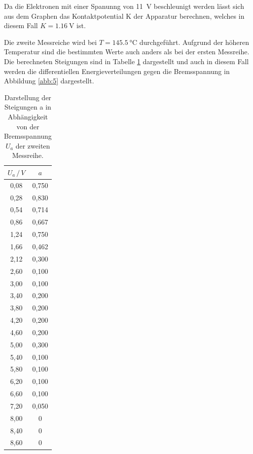 Da die Elektronen mit einer Spanunng von \SI{11}{\volt} beschleunigt werden lässt
sich aus dem Graphen das Kontaktpotential K der Apparatur berechnen, welches in diesem
Fall $ K = \SI{1.16}{\volt}$ ist.

Die zweite Messreiche wird bei $ T = \SI{145.5}{\celsius}$ durchgeführt.
Aufgrund der höheren Temperatur sind die bestimmten Werte auch anders als bei der
ersten Messreihe. Die berechneten Steigungen sind in Tabelle \ref{tab:3} dargestellt
und auch in diesem Fall werden die differentiellen Energieverteilungen gegen
die Bremsspannung in Abbildung \ref{abb:5} dargestellt.

\begin{table}[H]
  \centering
  \caption{Darstellung der Steigungen a in Abhängigkeit von der Bremsspannung $U_a$
  der zweiten Messreihe.}
  \label{tab:3}
  \begin{tabular}{c c}
    \toprule
    $U_a \, / \, V$ & $a$ \\
    \midrule
    0,08 & 0,750  \\
    0,28 & 0,830  \\
    0,54 & 0,714  \\
    0,86 & 0,667  \\
    1,24 & 0,750  \\
    1,66 & 0,462  \\
    2,12 & 0,300  \\
    2,60 & 0,100  \\
    3,00 & 0,100  \\
    3,40 & 0,200  \\
    3,80 & 0,200  \\
    4,20 & 0,200  \\
    4,60 & 0,200  \\
    5,00 & 0,300  \\
    5,40 & 0,100  \\
    5,80 & 0,100  \\
    6,20 & 0,100  \\
    6,60 & 0,100  \\
    7,20 & 0,050  \\
    8,00 & 0  \\
    8,40 & 0  \\
    8,60 & 0  \\
    \bottomrule
  \end{tabular}
\end{table}

